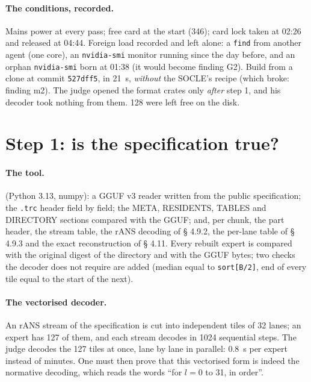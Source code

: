 \paragraph{The conditions, recorded.} Mains power at every pass; free card at the start (\SI{346}{\Mio}); card lock taken at 02:26 and released at 04:44. Foreign load recorded and left alone: a \texttt{find} from another agent (one core), an \texttt{nvidia-smi} monitor running since the day before, and an orphan \texttt{nvidia-smi} born at 01:38 (it would become finding G2). Build from a clone at commit \texttt{527dff5}, in \SI{21}{\second}, \emph{without} the SOCLE's recipe (which broke: finding m2). The judge opened the format crates only \emph{after} step 1, and his decoder took nothing from them. \SI{128}{\Go} were left free on the disk.

\section{Step 1: is the specification true?}\label{t2e-sec:geste1}

\paragraph{The tool.}  (Python 3.13, numpy): a GGUF v3 reader written from the public specification; the \texttt{.trc} header field by field; the META, RESIDENTS, TABLES and DIRECTORY sections compared with the GGUF; and, per chunk, the part header, the stream table, the rANS decoding of § 4.9.2, the per-lane table of § 4.9.3 and the exact reconstruction of § 4.11. Every rebuilt expert is compared with the original digest of the directory and with the GGUF bytes; two checks the decoder does not require are added (median equal to \texttt{sort[B/2]}, end of every tile equal to the start of the next).

\paragraph{The vectorised decoder.} An rANS stream of the specification is cut into independent tiles of 32 lanes; an expert has 127 of them, and each stream decodes in \num{1024} sequential steps. The judge decodes the 127 tiles at once, lane by lane in parallel: \SI{0.8}{\second} per expert instead of minutes. One must then prove that this vectorised form is indeed the normative decoding, which reads the words ``for $l = 0$ to 31, in order''.

